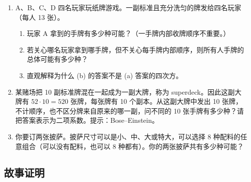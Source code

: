 \documentclass[UTF8, 12pt, fontset=fandol, oneside]{ctexart}
\begin{document}
\begin{enumerate}
  \item A、B、C、D 四名玩家玩纸牌游戏。一副标准且充分洗匀的牌发给四名玩家（每人 13 张）。
  \begin{enumerate}
    \item 玩家 A 拿到的手牌有多少种可能？（一手牌内部收牌顺序不重要。）
    \item 若关心哪名玩家拿到哪手牌，但不关心每手牌内部顺序，则所有人手牌的总体可能有多少种？
    \item 直观解释为什么 (b) 的答案不是 (a) 答案的四次方。
  \end{enumerate}

  \item 某赌场把 10 副标准牌混在一起成为一副大牌，称为 superdeck。因此这副大牌有 $52\cdot 10=520$ 张牌，每张牌有 10 个副本。从这副大牌中发出 10 张牌，不计顺序，也不区分牌来自原来的哪一副，问不同的 10 张手牌有多少种？请把答案表示为二项系数。提示：Bose--Einstein。

  \item 你要订两张披萨。披萨尺寸可以是小、中、大或特大，可以选择 8 种配料的任意组合（可以没有配料，也可以 8 种都有）。你的两张披萨共有多少种可能？
\end{enumerate}

\subsection*{故事证明}
\end{document}
